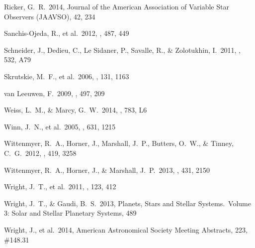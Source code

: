 \documentclass[11pt,preprint]{aastex}
\begin{document}
\begin{CJK*}{UTF8}{gbsn}
\begin{thebibliography}
 Ricker, G.~R.\ 2014, Journal of the 
American Association of Variable Star Observers (JAAVSO), 42, 234 %


 Sanchis-Ojeda, R., 
et al.\ 2012, \nat, 487, 449 %

 Schneider, J., Dedieu, C., 
Le Sidaner, P., Savalle, R., \& Zolotukhin, I.\ 2011, \aap, 532, A79

 Skrutskie, M.~F., et al.\ 
2006, \aj, 131, 1163 %


 van Leeuwen, F.\ 2009, \aap, 
497, 209 %

 Weiss, L.~M., \& Marcy,
  G.~W.\ 2014, \apjl, 783, L6  %

 Winn, J.~N., et al.\ 2005, \apj, 631, 
1215 %

 Wittenmyer, R.~A., 
Horner, J., Marshall, J.~P., Butters, O.~W., 
\& Tinney, C.~G.\ 2012, \mnras, 419, 3258 %

 Wittenmyer, R.~A., 
Horner, J., \& Marshall, J.~P.\ 2013, \mnras, 431, 2150 %

 Wright, J.~T., et al.\ 2011,
  \pasp, 123, 412 %

 Wright, J.~T., \& Gaudi, B.~S.\ 2013,
  Planets, Stars and Stellar Systems.~Volume 3: Solar and Stellar
  Planetary Systems, 489 %

 Wright, J., et al.\ 2014, 
American Astronomical Society Meeting Abstracts, 223, \#148.31


\end{thebibliography}
\end{CJK*}
\end{document}
